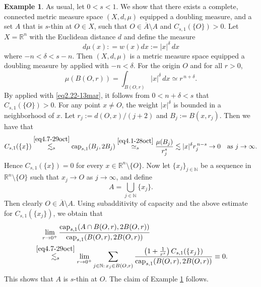 \documentclass[11pt,leqno]{amsart}
\numberwithin{equation}{section}
\theoremstyle{definition}
\newtheorem{example}[theorem]{Example}
\DeclareMathOperator{\capp}{cap}
\newcommand{\caps}{\capp_{s,1}}
\begin{document}
	
	
	\begin{example}\label{ex3.9-15dec}
		As usual, let $0<s<1$. We show that there exists a complete, connected metric measure space $(X,d,\mu)$ equipped a doubling measure, and a set $A$ that is $s$-thin at
		$O\in X$, such that $O\in \overline{A}\setminus A$ and $C_{s,1}(\{O\})>0$.
		Let $X=\mathbb{R}^n$ with the Euclidean distance $d$ and define the measure
		\[
		d\mu(x): =w(x)dx := |x|^{\delta}\,dx
		\]
		where $  -n < \delta < s-n.$
		Then $(X,d,\mu)$ is a metric measure space equipped a doubling measure {by \cite[Corollary 15.35]{HKM06} applied with $-n<\delta$.}
		For the origin $O$ and  { for all $ r>0$,}
		\begin{equation}\label{eq2.22-13mar}
			\mu(B(O,r)) = \int_{B(O,r)} |x|^{\delta}\,dx \simeq r^{\,n+\delta}.
		\end{equation}
		By \cite[Theorem 1.3]{BB23} { applied with \eqref{eq2.22-13mar}},  it follows from $0<n+\delta<s$ that $C_{s,1}(\{O\})>0$.			
		For any point $x\neq O$, the weight $|x|^{\delta}$ is bounded in a neighborhood of $x$. Let $r_j:= d(O,x)/(j+2)$ and $B_j:= B(x,r_j)$. Then we have that
		\[
		C_{s,1}(\{x\}) \overset{\eqref{eq4.7-29oct}}{\lesssim_s} \text{cap}_{s,1}(B_j, 2B_j) 
		\overset{\eqref{eq4.1-28oct}}{\simeq_s} \frac{\mu(B_j)}{r_j^s} 
		\lesssim |x|^\delta r_j^{\,n-s} \to 0 \quad \text{as } j\to\infty.
		\]
		Hence $C_{s,1}(\{x\}) = 0$ for every $x\in \mathbb{R}^n \setminus \{O\}$.
		Now let $\{x_j\}_{j\in\mathbb{N}}$ be a sequence in $\mathbb{R}^n\setminus \{O\}$ such that $x_j \to O$ as $j\to \infty$, and define
		\[
		A = \bigcup_{j\in\mathbb{N}} \{x_j\}.
		\]
		Then clearly $O \in \overline{A} \setminus A$.  
		Using subadditivity of capacity and the above estimate for $C_{s,1}(\{x_j\})$, we obtain that
		\begin{align*}
			&\quad \lim_{r\to0^+} \frac{\caps(A\cap B(O,r), 2B(O,r))}{\caps(B(O,r), 2B(O,r))}\\ 
			&\overset{\eqref{eq4.7-29oct}}{\lesssim_s} \lim_{r\to0^+} 
			\sum_{j\in\mathbb N:\, x_j\in B(O,r)}\frac{\left( 1+
				\frac{1}{r^s}\right)C_{s,1}(\{x_j\})}{\caps(B(O,r), 2B(O,r))} \equiv 0.
		\end{align*} 
		This shows that $A$ is $s$-thin at $O$. {The claim of Example \ref{ex3.9-15dec} follows.}
	\end{example}
	
\end{document}
